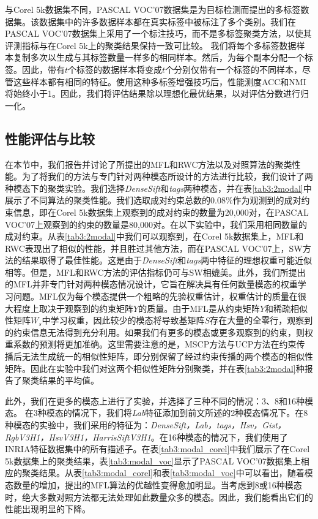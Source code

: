 与Corel 5k数据集不同，PASCAL VOC'07数据集是为目标检测而提出的多标签数据集。该数据集中的许多数据样本都在真实标签中被标注了多个类别。我们在PASCAL VOC'07数据集上采用了一个标注技巧，而不是多标签聚类方法，以使其评测指标与在Corel 5k上的聚类结果保持一致可比较。
我们将每个多标签数据样本复制多次以生成与其标签数量一样多的相同样本。然后，为每个副本分配一个标签。因此，带有$ t $个标签的数据样本将变成$ t $个分别仅带有一个标签的不同样本，尽管这些样本都有相同的特征。使用这种多标签增强技巧后，性能测度ACC和NMI将始终小于1。因此，我们将评估结果除以理想化最优结果，以对评估分数进行归一化。

\subsection{性能评估与比较}
在本节中，我们报告并讨论了所提出的MFL和RWC方法以及对照算法的聚类性能。为了将我们的方法与专门针对两种模态所设计的方法进行比较，我们设计了两种模态下的聚类实验。我们选择\textit{DenseSift}和\textit{tags}两种模态，并在表\ref{tab3:2modal}中展示了不同算法的聚类性能。我们选取成对约束总数的$0.08\%$作为观测到的成对约束信息，即在Corel 5k数据集上观察到的成对约束的数量为20,000对，在PASCAL VOC'07上观察到的约束的数量是80,000对。在以下实验中，我们采用相同数量的成对约束。从表\ref{tab3:2modal}中我们可以观察到，在Corel 5k数据集上，MFL和RWC表现出了相似的性能，并且胜过其他方法，而在PASCAL VOC'07上，SW方法的结果取得了最佳性能。这是由于\textit{DenseSift}和\textit{tags}两中特征的理想权重可能近似相等。但是，MFL和RWC方法的评估指标仍可与SW相媲美。此外，我们所提出的MFL并非专门针对两种模态情况设计，它旨在解决具有任何数量模态的权重学习问题。MFL仅为每个模态提供一个粗略的先验权重估计，权重估计的质量在很大程度上取决于观察到的约束矩阵$ {Y} $的质量。由于MFL是从约束矩阵$ {Y} $和稀疏相似性矩阵${W}_s $中学习权重，因此较少的模态将导致基矩阵$ {S} $存在大量的全零行，观察到的约束信息无法得到充分利用。如果我们有更多的模态或更多观察到的约束，则权重系数的预测将更加准确。这里需要注意的是，MSCP方法与UCP方法在约束传播后无法生成统一的相似性矩阵，即分别保留了经过约束传播的两个模态的相似性矩阵。因此在实验中我们对这两个相似性矩阵分别聚类，并在表\ref{tab3:2modal}种报告了聚类结果的平均值。

此外，我们在更多的模态上进行了实验，并选择了三种不同的情况：3、8和16种模态。 在3种模态的情况下，我们将\textit{Lab}特征添加到前文所述的2种模态情况下。在8种模态的实验中，我们采用的特征为：\textit{DenseSift，Lab，tags，Hsv，Gist，RgbV3H1，HsvV3H1，HarrisSiftV3H1}。在16种模态的情况下，我们使用了INRIA特征数据集中的所有描述子。在表\ref{tab3:modal_corel}中我们展示了在Corel 5k数据集上的聚类结果，表\ref{tab3:modal_voc}显示了PASCAL VOC'07数据集上相应的聚类结果。从表\ref{tab3:modal_corel}和表\ref{tab3:modal_voc}中可以看出，随着模态数量的增加，提出的MFL算法的优越性变得愈加明显。当考虑到8或16种模态时，绝大多数对照方法都无法处理如此数量众多的模态。因此，我们能看出它们的性能出现明显的下降。


